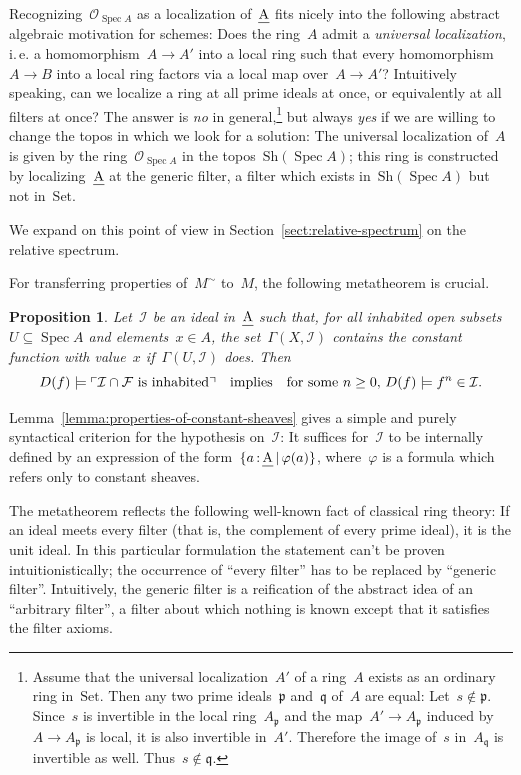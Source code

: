\documentclass[10pt,reqno,a4paper]{amsbook}
\makeatletter
\theoremstyle{definition}
\theoremstyle{plain}
\newtheorem{prop}[defn]{Proposition}
\theoremstyle{remark}
\newcommand{\F}{\mathcal{F}}
\renewcommand{\O}{\mathcal{O}}
\newcommand{\I}{\mathcal{I}}
\newcommand{\ppp}{\mathfrak{p}}
\newcommand{\qqq}{\mathfrak{q}}
\let\oldul\ul
\renewcommand{\ul}[1]{\text{\oldul{$#1$}}}
\newcommand{\Set}{\mathrm{Set}}
\newcommand{\Sh}{\mathrm{Sh}}
\DeclareMathOperator{\Spec}{Spec}
\newcommand{\?}{\,{:}\,}
\renewcommand{\_}{\mathpunct{.}\,}
\newcommand{\speak}[1]{\ulcorner\text{\textnormal{#1}}\urcorner}
\newcommand{\ie}{i.\,e.\@\xspace}
\makeatother
\begin{document}
Recognizing~$\O_{\Spec A}$ as a localization of~$\ul{A}$ fits nicely into the
following abstract algebraic motivation for schemes: Does the ring~$A$ admit a
\emph{universal localization}, \ie a homomorphism~$A \to A'$ into a local ring
such that every homomorphism~$A \to B$ into a local ring factors via a local
map over~$A \to A'$? Intuitively speaking, can we localize a ring at all prime
ideals at once, or equivalently at all filters at once? The answer is \emph{no}
in general,\footnote{Assume that the universal localization~$A'$ of a ring~$A$ exists as an ordinary ring in~$\Set$. Then any
two prime ideals~$\ppp$ and~$\qqq$ of~$A$ are equal: Let~$s \not\in \ppp$.
Since~$s$ is invertible in the local ring~$A_\ppp$ and the map~$A' \to A_\ppp$
induced by~$A \to A_\ppp$ is local, it is also invertible in~$A'$. Therefore the image of~$s$ in~$A_\qqq$ is
invertible as well. Thus~$s \not\in \qqq$.} but always \emph{yes} if we are
willing to change the topos in which we look for a solution: The universal
localization of~$A$ is given by the ring~$\O_{\Spec A}$ in the topos~$\Sh(\Spec
A)$; this ring is constructed by localizing~$\ul{A}$ at the generic
filter, a filter which exists in~$\Sh(\Spec A)$ but not in~$\Set$.

We expand on this point of view in Section~\ref{sect:relative-spectrum} on the
relative spectrum.

For transferring properties of~$M^\sim$ to~$M$, the following metatheorem is
crucial.
\begin{prop}\label{prop:metaproperty-of-the-generic-filter}
Let~$\I$ be an ideal in~$\ul{A}$ such that, for all inhabited
open subsets~$U \subseteq \Spec A$ and elements~$x \in A$, the set~$\Gamma(X,\I)$
contains the constant function with value~$x$ if~$\Gamma(U,\I)$ does. Then
\[ D(f) \models \speak{$\I \cap \F$ is inhabited}
  \quad\text{implies}\quad
  \text{for some~$n \geq 0$, $D(f) \models f^n \in \I$.} \]
\end{prop}

Lemma~\ref{lemma:properties-of-constant-sheaves} gives a simple and purely
syntactical criterion for the hypothesis on~$\I$: It suffices for~$\I$ to be
internally defined by an expression of the form~$\{ a\?\ul{A} \,|\, \varphi(a)
\}$, where~$\varphi$ is a formula which refers only to constant sheaves.

The metatheorem reflects the following well-known fact of classical
ring theory: If an ideal meets every filter (that is, the complement of every
prime ideal), it is the unit ideal. In this particular formulation the statement can't be
proven intuitionistically; the occurrence of ``every filter'' has to be
replaced by ``generic filter''. Intuitively, the generic filter is a
reification of the abstract idea of an ``arbitrary filter'', a filter about
which nothing is known except that it satisfies the filter axioms.
\end{document}
